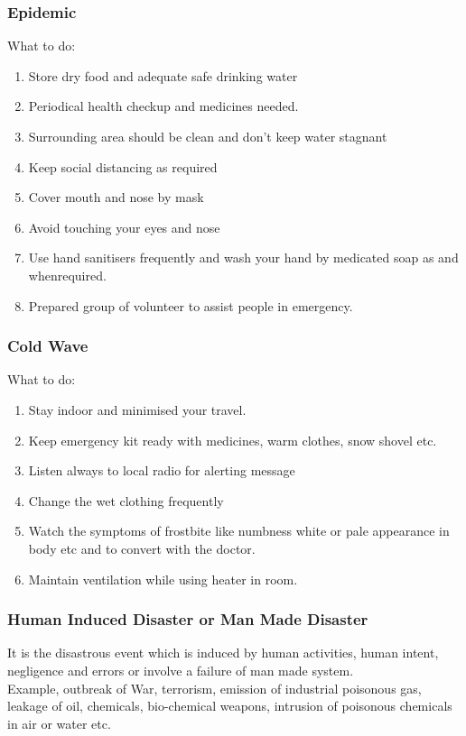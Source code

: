 \documentclass[12pt,a4paper]{article}
\begin{document}
\subsubsection*{Epidemic}
What to do:
\begin{enumerate}
	\item Store dry food and adequate safe drinking water
	\item Periodical health checkup and medicines needed.
	\item Surrounding area should be clean and don't keep water stagnant
	\item Keep social distancing as required
	\item Cover mouth and nose by mask
	\item Avoid touching your eyes and nose
	\item Use hand sanitisers frequently and wash your hand by medicated soap as and whenrequired.
	\item Prepared group of volunteer to assist people in emergency.
\end{enumerate}
\subsubsection*{Cold Wave}
What to do:
\begin{enumerate}
	\item Stay indoor and minimised your travel.
	\item Keep emergency kit ready with medicines, warm clothes, snow shovel etc.
	\item Listen always to local radio for alerting message
	\item Change the wet clothing frequently 
	\item Watch the symptoms of frostbite like numbness white or pale appearance in body etc and to convert with the doctor.
	\item Maintain ventilation while using heater in room.
\end{enumerate}

\subsubsection*{Human Induced Disaster or Man Made Disaster}
It is the disastrous event which is induced by human activities, human intent, negligence and errors or involve a failure of man made system. \\
Example, outbreak of War, terrorism, emission of industrial poisonous gas, leakage of oil, chemicals, bio-chemical weapons, intrusion of poisonous chemicals in air or water etc.
\end{document}
